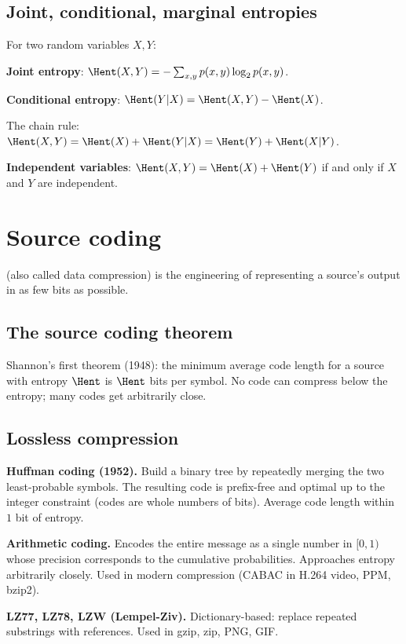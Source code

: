 \subsection{Joint, conditional, marginal entropies}

For two random variables $X, Y$:

\textbf{Joint entropy}: $\Hent(X, Y) = -\sum_{x,y} p(x,y) \log_2 p(x,y)$.

\textbf{Conditional entropy}: $\Hent(Y|X) = \Hent(X, Y) - \Hent(X)$.

The chain rule: $\Hent(X, Y) = \Hent(X) + \Hent(Y|X) = \Hent(Y) + \Hent(X|Y)$.

\textbf{Independent variables}: $\Hent(X, Y) = \Hent(X) + \Hent(Y)$ if and only if $X$ and $Y$ are independent.

\section{Source coding}

 (also called data compression) is the engineering of representing a source's output in as few bits as possible.

\subsection{The source coding theorem}

Shannon's first theorem (1948): the minimum average code length for a source with entropy $\Hent$ is $\Hent$ bits per symbol. No code can compress below the entropy; many codes get arbitrarily close.

\subsection{Lossless compression}

\textbf{Huffman coding (1952).} Build a binary tree by repeatedly merging the two least-probable symbols. The resulting code is prefix-free and optimal up to the integer constraint (codes are whole numbers of bits). Average code length within $1$ bit of entropy.

\textbf{Arithmetic coding.} Encodes the entire message as a single number in $[0, 1)$ whose precision corresponds to the cumulative probabilities. Approaches entropy arbitrarily closely. Used in modern compression (CABAC in H.264 video, PPM, bzip2).

\textbf{LZ77, LZ78, LZW (Lempel-Ziv).} Dictionary-based: replace repeated substrings with references. Used in gzip, zip, PNG, GIF.

